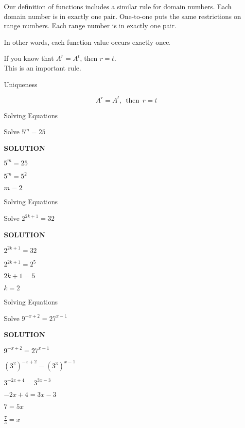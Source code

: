 \documentclass{ximera}
\begin{document}
Our definition of functions includes a similar rule for domain numbers.  Each domain number is in exactly one pair.  One-to-one puts the same restrictions on range numbers.  Each range number is in exactly one pair.

In other words, each function value occurs exactly once.


If you know that $A^r = A^t$, then $r=t$. \\


This is an important rule.


\begin{fact} Uniqueness


\[      A^r = A^t, \,  \text{ then }  \, r=t    \]


\end{fact}




\begin{example} Solving Equations


Solve $5^m = 25$


\textbf{\textcolor{purple!50!blue!90!black}{SOLUTION}}


$5^m = 25$

$5^m = 5^2$

$m = 2$

\end{example}










\begin{example} Solving Equations


Solve $2^{2k+1} = 32$


\textbf{\textcolor{purple!50!blue!90!black}{SOLUTION}}


$2^{2k+1} = 32$

$2^{2k+1} = 2^5$

$2k + 1 = 5$

$k = 2$

\end{example}






\begin{example} Solving Equations


Solve $9^{-x + 2} = 27^{x-1}$


\textbf{\textcolor{purple!50!blue!90!black}{SOLUTION}}


$9^{-x + 2} = 27^{x-1}$

$(3^2)^{-x + 2} = (3^3)^{x-1}$

$3^{-2x+4} = 3^{3x-3}$

$-2x + 4 = 3x - 3$

$7 = 5x$


$\frac{7}{5} = x$

\end{example}
\end{document}
